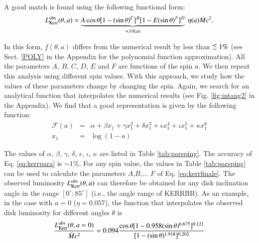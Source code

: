 \documentclass{aa}
\def\spose#1{\hbox to 0pt{#1\hss}}
\newcommand\lsim{\mathrel{\spose{\lower 3pt\hbox{$\mathchar"218$}}
     \raise 2.0pt\hbox{$\mathchar"13C$}}}
\begin{document}
\noindent A good match is found using the following functional form:
	\begin{equation} \label{eq:kerrfinale}
		L^{\rm obs}_{\rm Kerr} (\theta, a) = \underbrace{A \cos \theta [1 - (\sin \theta)^C]^B 
[1 - E (\sin \theta)^F]^D}_{= f(\theta, a)} \ \eta(a) \dot{M} c^2.
	\end{equation}

\noindent In this form, $f(\theta, a)$ differs from the numerical result by less than $\lsim 1 \%$ (see Sect. \ref{POLY} in the Appendix for the polynomial function approximation). All the parameters $A$, $B$, $C$, $D$, $E$ and $F$ are functions of the spin $a$. We then repeat this analysis using different spin values. With this approach, we study how the values of these parameters change by changing the spin. Again, we search for an analytical function that interpolates the numerical results (see Fig. \ref{fig:intang2} in the Appendix). We find that a good representation is given by the following function:
	\begin{eqnarray} \label{eq:kerrpara}
		\mathcal{F}(a) &=& \alpha + \beta x_1 + \gamma x_1^2 + \delta x_1^3 + \epsilon x_1^4 + \iota x_1^5 + \kappa x_1^6 
		\nonumber \\
		x_1 &=& \log(1-a)
	\end{eqnarray}

The values of $\alpha$, $\beta$, $\gamma$, $\delta$, $\epsilon$, $\iota$, $\kappa$ are listed in Table \ref{tab:parsping}. The accuracy of Eq. \ref{eq:kerrpara} is $\sim 1 \%$. For any spin value, the values in Table \ref{tab:parsping} can be used to calculate the parameters $A$,$B$,... $F$ of Eq. \ref{eq:kerrfinale}. The observed luminosity $L^{\rm obs}_{\rm Kerr} (\theta, a)$ can therefore be obtained for any disk inclination angle in the range $[0^{\circ}:85^{\circ}]$ (i.e., the angle range of KERRBB). As an example, in the case with $a = 0$ ($\eta = 0.057$), the function that interpolates the observed disk luminosity for different angles $\theta$ is
	\begin{equation} \label{eq:kerrex}
		\frac{L^{\rm obs}_{\rm Kerr} (\theta, a=0)}{\dot{M} c^2} = 0.094 \frac{\cos \theta [1 - 0.958 (\sin \theta)^{6.675}]^{0.121}}{[1 - (\sin \theta)^{1.918}]^{0.202} }
	\end{equation}
\end{document}
